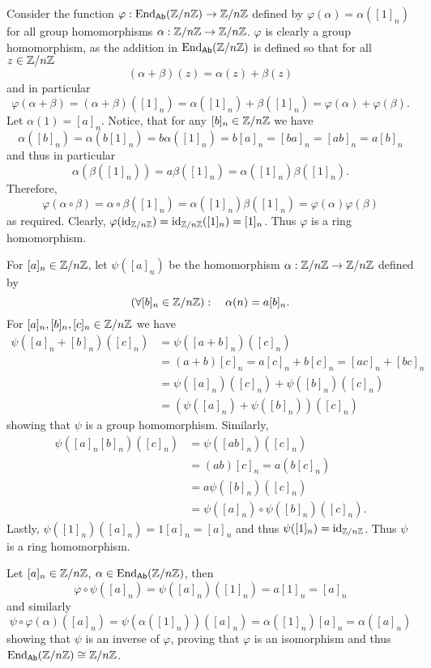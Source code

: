\begin{solution}
	Consider the function $\varphi: \mathrm{End}_{\mathsf{Ab}}(\mathbb{Z}/n\mathbb{Z}) \to \mathbb{Z}/n\mathbb{Z}$ defined by $\varphi(\alpha) = \alpha([1]_n)$ for all group homomorphisms $\alpha: \mathbb{Z}/n\mathbb{Z} \to \mathbb{Z}/n\mathbb{Z}$. $\varphi$ is clearly a group homomorphism, as the addition in $\mathrm{End}_{\mathsf{Ab}}(\mathbb{Z}/n\mathbb{Z})$ is defined so that for all $z \in \mathbb{Z}/n\mathbb{Z}$
	\[
		(\alpha + \beta)(z) = \alpha(z) + \beta(z)
	\]
	and in particular
	\[
		\varphi(\alpha + \beta) = (\alpha + \beta)([1]_n) = \alpha([1]_n) + \beta([1]_n) = \varphi(\alpha) + \varphi(\beta) \text{.}
	\]
	Let $\alpha(1) = [a]_n$. Notice, that for any $[b]_n \in \mathbb{Z}/n\mathbb{Z}$ we have
	\[
		\alpha([b]_n) = \alpha(b[1]_n) = b \alpha([1]_n) = b[a]_n = [ba]_n = [ab]_n = a[b]_n
	\]
	and thus in particular
	\[
		\alpha(\beta([1]_n)) = a \beta([1]_n) = \alpha([1]_n) \beta([1]_n) \text{.}
	\]
	Therefore,
	\[
		\varphi(\alpha \circ \beta) = \alpha \circ \beta([1]_n) = \alpha([1]_n) \beta([1]_n) = \varphi(\alpha)\varphi(\beta)
	\]
	as required. Clearly, $\varphi(\mathrm{id}_{\mathbb{Z}/n\mathbb{Z}}) = \mathrm{id}_{\mathbb{Z}/n\mathbb{Z}}([1]_n) = [1]_n$. Thus $\varphi$ is a ring homomorphism.
	
	For $[a]_n \in \mathbb{Z}/n\mathbb{Z}$, let $\psi([a]_n)$ be the homomorphism $\alpha: \mathbb{Z}/n\mathbb{Z} \to \mathbb{Z}/n\mathbb{Z}$ defined by
	\[
		(\forall [b]_n \in \mathbb{Z}/n\mathbb{Z}):\quad\alpha(n) = a[b]_n \text{.}
	\]
	For $[a]_n, [b]_n, [c]_n \in \mathbb{Z}/n\mathbb{Z}$ we have
	\begin{align*}
		\psi([a]_n + [b]_n)([c]_n) &= \psi([a+b]_n)([c]_n) \\
		&= (a+b)[c]_n = a[c]_n + b[c]_n = [ac]_n + [bc]_n \\
		&= \psi([a]_n)([c]_n) + \psi([b]_n)([c]_n) \\
		&= (\psi([a]_n) + \psi([b]_n))([c]_n)
	\end{align*}
	showing that $\psi$ is a group homomorphism. Similarly,
	\begin{align*}
		\psi([a]_n [b]_n)([c]_n) &= \psi([ab]_n)([c]_n) \\
		&= (ab)[c]_n = a(b[c]_n) \\
		&= a \psi([b]_n)([c]_n) \\
		&= \psi([a]_n) \circ \psi([b]_n) ([c]_n) \text{.}
	\end{align*}
	Lastly, $\psi([1]_n)([a]_n) = 1[a]_n = [a]_n$ and thus $\psi([1]_n) = \mathrm{id}_{\mathbb{Z}/n\mathbb{Z}}$. Thus $\psi$ is a ring homomorphism.
	
	Let $[a]_n \in \mathbb{Z}/n\mathbb{Z}$, $\alpha \in \mathrm{End}_{\mathsf{Ab}}(\mathbb{Z}/n\mathbb{Z})$, then
	\[
		\varphi \circ \psi ([a]_n) = \psi([a]_n)([1]_n) = a[1]_n = [a]_n
	\]
	and similarly
	\[
		\psi \circ \varphi (\alpha)([a]_n) = \psi(\alpha([1]_n))([a]_n) = \alpha([1]_n)[a]_n = \alpha([a]_n)
	\]
	showing that $\psi$ is an inverse of $\varphi$, proving that $\varphi$ is an isomorphism and thus $\mathrm{End}_{\mathsf{Ab}}(\mathbb{Z}/n\mathbb{Z}) \cong \mathbb{Z}/n\mathbb{Z}$.
\end{solution}

